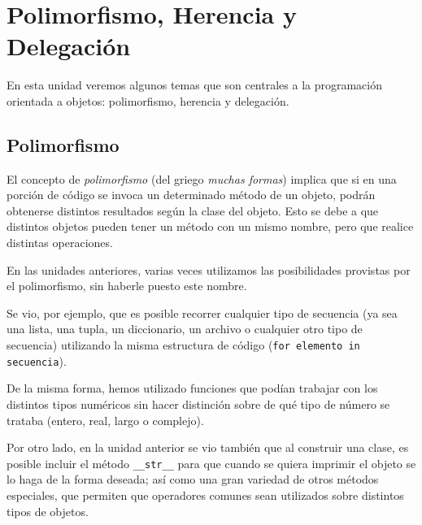 
%

\chapter{Polimorfismo, Herencia y Delegación}

En esta unidad veremos algunos temas que son centrales a la programación
orientada a objetos: polimorfismo, herencia y delegación.

\section{Polimorfismo}

El concepto de {\it polimorfismo} (del griego {\it muchas formas}) implica
que si en una porción de código se invoca un determinado método de un
objeto, podrán obtenerse distintos resultados según la clase del objeto.
Esto se debe a que distintos objetos pueden tener un método con un mismo
nombre, pero que realice distintas operaciones.  

En las unidades anteriores, varias veces utilizamos las posibilidades
provistas por el polimorfismo, sin haberle puesto este nombre.

Se vio, por ejemplo, que es posible recorrer cualquier tipo de secuencia
(ya sea una lista, una tupla, un diccionario, un archivo o cualquier otro tipo
de secuencia) utilizando la misma estructura de código 
(\lstinline!for elemento in secuencia!).  

De la misma forma, hemos utilizado funciones que podían trabajar con los
distintos tipos numéricos sin hacer distinción sobre de qué tipo de número
se trataba (entero, real, largo o complejo).

Por otro lado, en la unidad anterior se vio también que al construir una
clase, es posible incluir el método \lstinline!__str__! para que cuando se
quiera imprimir el objeto se lo haga de la forma deseada; así como una
gran variedad de otros métodos especiales, que permiten que operadores
comunes sean utilizados sobre distintos tipos de objetos.

